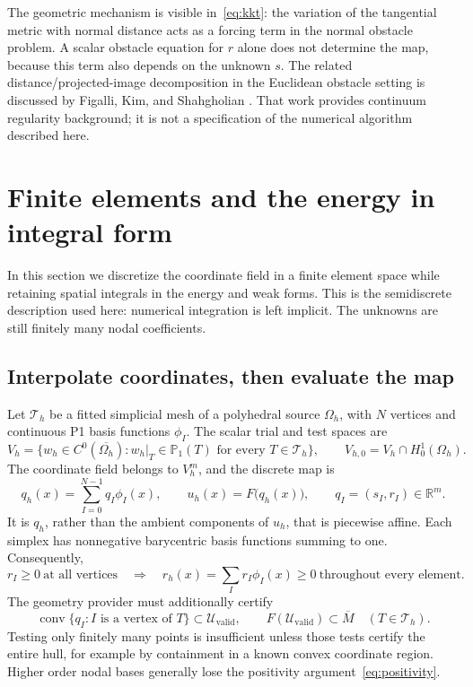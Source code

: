 \documentclass[11pt,a4paper]{article}
\newcommand{\R}{\mathbb R}
\newcommand{\conv}{\operatorname{conv}}
\begin{document}
The geometric mechanism is visible in~\eqref{eq:kkt}: the variation of
the tangential metric with normal distance acts as a forcing term in the
normal obstacle problem. A scalar obstacle equation for \(r\) alone does
not determine the map, because this term also depends on the unknown \(s\).
The related distance/projected-image decomposition in the Euclidean
obstacle setting is discussed by Figalli, Kim, and Shahgholian
\cite{fks}. That work provides continuum regularity background; it is
not a specification of the numerical algorithm described here.

\section{Finite elements and the energy in integral form}
\label{sec:discrete}

In this section we discretize the coordinate field in a finite element
space while retaining spatial integrals in the energy and weak forms.
This is the semidiscrete description used here: numerical integration is
left implicit. The unknowns are still finitely many nodal coefficients.

\subsection{Interpolate coordinates, then evaluate the map}
Let \(\mathcal T_h\) be a fitted simplicial mesh of a polyhedral source
\(\Omega_h\), with \(N\) vertices and continuous P1 basis functions
\(\phi_I\). The scalar trial and test spaces are
\begin{equation}
 V_h=\{w_h\in C^0(\overline{\Omega_h}):
           w_h|_T\in\mathbb P_1(T)\text{ for every }T\in\mathcal T_h\},
 \qquad V_{h,0}=V_h\cap H^1_0(\Omega_h).
 \label{eq:fe-spaces}
\end{equation}
The coordinate field belongs to \(V_h^m\), and the discrete map is
\begin{equation}
 q_h(x)=\sum_{I=0}^{N-1}q_I\phi_I(x),\qquad
 u_h(x)=F\bigl(q_h(x)\bigr),\qquad q_I=(s_I,r_I)\in\R^m.
 \label{eq:interpolation}
\end{equation}
It is \(q_h\), rather than the ambient components of \(u_h\), that is
piecewise affine. Each simplex has nonnegative barycentric basis functions
summing to one. Consequently,
\begin{equation}
 r_I\geq0\ \text{at all vertices}
 \quad\Longrightarrow\quad
 r_h(x)=\sum_I r_I\phi_I(x)\geq0\ \text{throughout every element}.
 \label{eq:positivity}
\end{equation}
The geometry provider must additionally certify
\begin{equation}
 \conv\{q_I:I\text{ is a vertex of }T\}
 \subset \mathcal U_{\mathrm{valid}},\qquad
 F(\mathcal U_{\mathrm{valid}})\subset\overline M
 \quad(T\in\mathcal T_h).
 \label{eq:certificate}
\end{equation}
Testing only finitely many points is insufficient unless those
tests certify the entire hull, for example by containment in a known convex
coordinate region. Higher order nodal bases generally lose the positivity
argument~\eqref{eq:positivity}.
\end{document}
